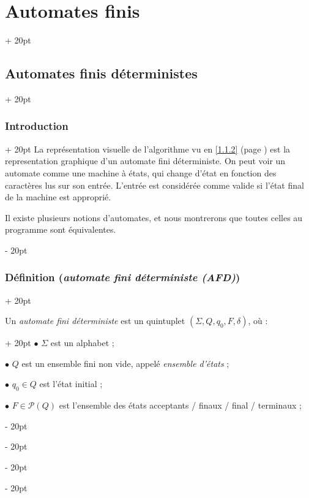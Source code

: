 \documentclass[a4paper, 12pt, twoside]{article}
\newcommand{\ind}[1][20pt]{\advance\leftskip + #1}
\newcommand{\deind}[1][20pt]{\advance\leftskip - #1}
\newenvironment{indt}[2][20pt]{#2 \par \ind[#1]}{\par \deind} %
\begin{document}
    \begin{indt}{\section{Automates finis}}
        \label{2}

        \begin{indt}{\subsection{Automates finis déterministes}}
            \begin{indt}{\subsubsection{Introduction}}
                La représentation visuelle de l'algorithme vu en \ref{1.1.2} (page \pageref{1.1.2}) est la representation graphique d'un automate fini déterministe.
                On peut voir un automate comme une machine à états, qui change d'état en fonction des caractères lus sur son entrée. L'entrée est considérée comme valide si l'état final de la machine est approprié.

                Il existe plusieurs notions d'automates, et nous montrerons que toutes celles au programme sont équivalentes.
            \end{indt}

            \vspace{12pt}
            
            \begin{indt}{\subsubsection{Définition (\textit{automate fini déterministe (AFD)})}}
                \label{2.1.2}

                \begin{indt}{Un \emph{automate fini déterministe} est un quintuplet $(\Sigma, Q, q_0, F, \delta)$, où :}
                    $\bullet$ $\Sigma$ est un alphabet ;

                    $\bullet$ $Q$ est un ensemble fini non vide, appelé \emph{ensemble d'états} ;

                    $\bullet$ $q_0 \in Q$ est l'état initial ;

                    $\bullet$ $F \in \mathcal P(Q)$ est l'ensemble des états acceptants / finaux / final / terminaux ;


\end{indt}
\end{indt}
\end{indt}
\end{indt}
\end{document}
